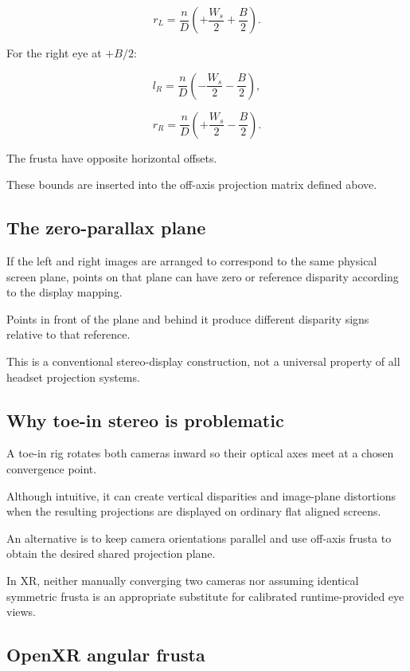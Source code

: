 \[ \boxed{ r_L=\frac nD\left(+\frac{W_s}{2}+\frac B2\right). } \]

For the right eye at \(+B/2\):

\[ \boxed{ l_R=\frac nD\left(-\frac{W_s}{2}-\frac B2\right), } \]

\[ \boxed{ r_R=\frac nD\left(+\frac{W_s}{2}-\frac B2\right). } \]

The frusta have opposite horizontal offsets.

These bounds are inserted into the off-axis projection matrix defined above.

\subsection{The zero-parallax plane}\label{02-foundations-ii-ch035-the-zero-parallax-plane}

If the left and right images are arranged to correspond to the same physical screen plane, points on that plane can have zero or reference disparity according to the display mapping.

Points in front of the plane and behind it produce different disparity signs relative to that reference.

This is a conventional stereo-display construction, not a universal property of all headset projection systems.

\subsection{Why toe-in stereo is problematic}\label{02-foundations-ii-ch035-why-toe-in-stereo-is-problematic}

A toe-in rig rotates both cameras inward so their optical axes meet at a chosen convergence point.

Although intuitive, it can create vertical disparities and image-plane distortions when the resulting projections are displayed on ordinary flat aligned screens.

An alternative is to keep camera orientations parallel and use off-axis frusta to obtain the desired shared projection plane.

In XR, neither manually converging two cameras nor assuming identical symmetric frusta is an appropriate substitute for calibrated runtime-provided eye views.

\subsection{OpenXR angular frusta}\label{02-foundations-ii-ch035-openxr-angular-frusta}

